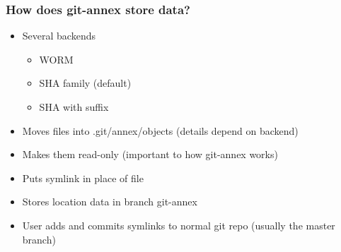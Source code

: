 \documentclass[t]{beamer}
\begin{document}
\begin{frame}
	\frametitle{How does git-annex store data?}
	\begin{itemize}
		\item Several backends
		\begin{itemize}
			\item WORM
			\item SHA family (default)
			\item SHA with suffix
		\end{itemize}
		\item Moves files into .git/annex/objects (details depend on backend)
		\item Makes them read-only (important to how git-annex works)
		\item Puts symlink in place of file
		\item Stores location data in branch git-annex
		\item User adds and commits symlinks to normal git repo (usually the master branch)
	\end{itemize}
\end{frame}


\end{document}
